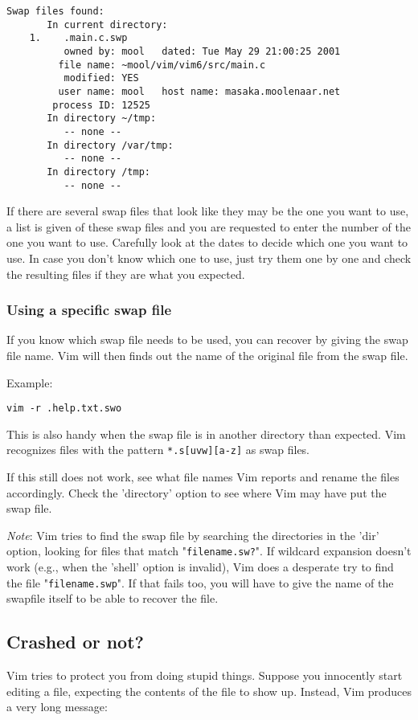 \begin{Verbatim}[samepage=true]
    Swap files found: 
       In current directory: 
    1.    .main.c.swp 
          owned by: mool   dated: Tue May 29 21:00:25 2001 
         file name: ~mool/vim/vim6/src/main.c 
          modified: YES 
         user name: mool   host name: masaka.moolenaar.net 
        process ID: 12525 
       In directory ~/tmp: 
          -- none -- 
       In directory /var/tmp: 
          -- none -- 
       In directory /tmp: 
          -- none -- 
\end{Verbatim}

If there are several swap files that look like they may be the one you want to use, a list is given of these swap files and you are requested to enter the number of the one you want to use.
Carefully look at the dates to decide which one you want to use.
In case you don't know which one to use, just try them one by one and check the resulting files if they are what you expected.

\subsubsection{Using a specific swap file}
If you know which swap file needs to be used, you can recover by giving the swap file name.
Vim will then finds out the name of the original file from the swap file.

Example:
\begin{Verbatim}[samepage=true]
 vim -r .help.txt.swo
\end{Verbatim}

This is also handy when the swap file is in another directory than expected.
Vim recognizes files with the pattern \verb!*.s[uvw][a-z]! as swap files.

If this still does not work, see what file names Vim reports and rename the files accordingly.
Check the 'directory' option to see where Vim may have put the swap file.

\emph{Note}: Vim tries to find the swap file by searching the directories in the 'dir' option, looking for files that match "\verb!filename.sw?!".
If wildcard expansion doesn't work (e.g., when the 'shell' option is invalid), Vim does a desperate try to find the file "\verb!filename.swp!".
If that fails too, you will have to give the name of the swapfile itself to be able to recover the file.
\subsection{Crashed or not?}
\label{ATTENTION}
\label{E325}
Vim tries to protect you from doing stupid things.
Suppose you innocently start editing a file, expecting the contents of the file to show up.
Instead, Vim produces a very long message:

